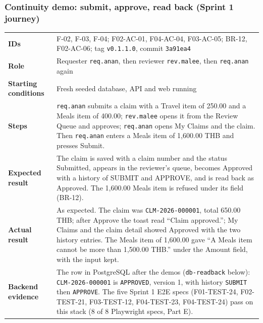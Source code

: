 \newcommand{\demofacts}[7]{%
  \begin{center}\small
  \begin{tabular}{@{}>{\bfseries}p{3.1cm}p{13.2cm}@{}}
  \toprule
  IDs & #1 \\
  Role & #2 \\
  Starting conditions & #3 \\
  Steps & #4 \\
  Expected result & #5 \\
  Actual result & #6 \\
  Backend evidence & #7 \\
  \bottomrule
  \end{tabular}
  \end{center}}

\subsubsection*{Continuity demo: submit, approve, read back (Sprint 1 journey)}

\demofacts
 {F-02, F-03, F-04; F02-AC-01, F04-AC-04, F03-AC-05; BR-12, F02-AC-06; tag \texttt{v0.1.1.0}, commit \texttt{3a91ea4}}
 {Requester \texttt{req.anan}, then reviewer \texttt{rev.malee}, then \texttt{req.anan} again}
 {Fresh seeded database, API and web running}
 {\texttt{req.anan} submits a claim with a Travel item of 250.00 and a Meals item of 400.00; \texttt{rev.malee} opens it from the Review Queue and approves; \texttt{req.anan} opens My Claims and the claim. Then \texttt{req.anan} enters a Meals item of 1,600.00 THB and presses Submit.}
 {The claim is saved with a claim number and the status Submitted, appears in the reviewer's queue, becomes Approved with a history of SUBMIT and APPROVE, and is read back as Approved. The 1,600.00 Meals item is refused under its field (BR-12).}
 {As expected. The claim was \texttt{CLM-2026-000001}, total 650.00 THB; after Approve the toast read ``Claim approved.''; My Claims and the claim detail showed Approved with the two history entries. The Meals item of 1,600.00 gave ``A Meals item cannot be more than 1,500.00 THB.'' under the Amount field, with the input kept.}
 {The row in PostgreSQL after the demos (\texttt{db-readback} below): \texttt{CLM-2026-000001} is \texttt{APPROVED}, version 1, with history \texttt{SUBMIT} then \texttt{APPROVE}. The five Sprint 1 E2E specs (F01-TEST-24, F02-TEST-21, F03-TEST-12, F04-TEST-23, F04-TEST-24) pass on this stack (8 of 8 Playwright specs, Part E).}

